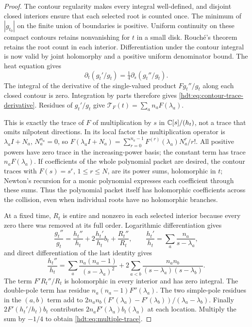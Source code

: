 \documentclass[11pt]{article}
\begin{document}
\begin{proof}
The contour regularity makes every integral well-defined, and
disjoint closed interiors ensure that each selected root is counted
once. The minimum of $|g_{t_0}|$ on the finite union of boundaries is
positive. Uniform continuity on these compact contours retains
nonvanishing for $t$ in a small disk. Rouch\'e's theorem retains
the root count in each interior. Differentiation under the contour
integral is now valid by joint holomorphy and a positive uniform
denominator bound. The heat equation gives
\[
\partial_t(g_t'/g_t)
=\tfrac14\partial_s(g_t''/g_t).
\]
The integral of the derivative of the single-valued product
$F g_t''/g_t$ along each closed contour is zero. Integration by
parts therefore gives \eqref{hdt:eq:contour-trace-derivative}.
Residues of $g_t'/g_t$ give
$\mathscr T_F(t)=\sum_a n_aF(\lambda_a)$.

This is exactly the trace of $F$ of multiplication by $s$ in
$\mathbb C[s]/(h_t)$, not a trace that omits nilpotent directions.
In its local factor the multiplication operator is
$\lambda_a I+N_a$, $N_a^{n_a}=0$, so
$F(\lambda_a I+N_a)=\sum_{r=0}^{n_a-1}
F^{(r)}(\lambda_a)N_a^r/r!$.
All positive powers have zero trace in the increasing-power basis;
the constant term has trace $n_aF(\lambda_a)$.
If coefficients of the whole polynomial packet are desired, the
contour traces with $F(s)=s^r$, $1\leq r\leq N$, are its power
sums, holomorphic in $t$; Newton's recursion for a monic polynomial
expresses each coefficient through these sums. Thus the polynomial
packet itself has holomorphic coefficients across the collision,
even when individual roots have no holomorphic branches.

At a fixed time, $R_t$ is entire and nonzero in each selected
interior because every zero there was removed at its full order.
Logarithmic differentiation gives
\[
\frac{g_t''}{g_t}=\frac{h_t''}{h_t}
+2\frac{h_t'}{h_t}b_t+\frac{R_t''}{R_t},\qquad
\frac{h_t'}{h_t}=\sum_a\frac{n_a}{s-\lambda_a},
\]
and direct differentiation of the last identity gives
\[
\frac{h_t''}{h_t}
=\sum_a\frac{n_a(n_a-1)}{(s-\lambda_a)^2}
+2\sum_{a<b}\frac{n_an_b}{(s-\lambda_a)(s-\lambda_b)}.
\]
The term $F'R_t''/R_t$ is holomorphic in every interior and has
zero integral. The double-pole term has residue
$n_a(n_a-1)F''(\lambda_a)$. The two simple-pole residues in the
$(a,b)$ term add to
$2n_an_b(F'(\lambda_a)-F'(\lambda_b))/(\lambda_a-\lambda_b)$.
Finally $2F'(h_t'/h_t)b_t$ contributes
$2n_aF'(\lambda_a)b_t(\lambda_a)$ at each location.
Multiply the sum by $-1/4$ to obtain \eqref{hdt:eq:multiple-trace}.
\end{proof}
\end{document}
